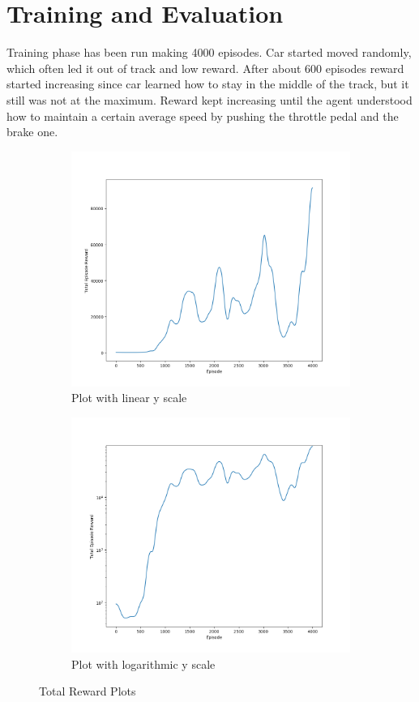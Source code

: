 \documentclass[Lau,oneside,noexaminfo]{sapthesis} %
\begin{document}
\chapter{Training and Evaluation}
Training phase has been run making 4000 episodes. Car started moved randomly, which often led it out of track and low reward. After about 600 episodes reward started increasing since car learned how to stay in the middle of the track, but it still was not at the maximum. Reward kept increasing until the agent understood how to maintain a certain average speed by pushing the throttle pedal and the brake one.

\begin{figure}[H]
\centering
\begin{subfigure}{.5\textwidth}
  \centering
  \includegraphics[width=.9\linewidth]{reward}
  \caption{Plot with linear y scale}
\end{subfigure}%
\begin{subfigure}{.5\textwidth}
  \centering
  \includegraphics[width=.9\linewidth]{rewardlog}
  \caption{Plot with logarithmic y scale}
\end{subfigure}
\caption{Total Reward Plots}
\label{fig:test}
\end{figure}
\end{document}
